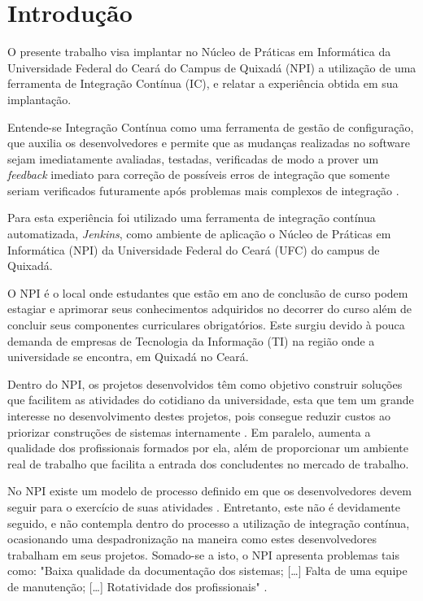 \chapter{Introdução}

O presente trabalho visa implantar no Núcleo de Práticas em Informática da Universidade Federal do Ceará do Campus de Quixadá (NPI) a utilização de uma ferramenta de Integração Contínua (IC), e relatar a experiência obtida em sua implantação.

Entende-se Integração Contínua como uma ferramenta de gestão de configuração, que auxilia os desenvolvedores e permite que as mudanças realizadas no software sejam imediatamente avaliadas, testadas, verificadas de modo a prover um  \textit{feedback} imediato para correção de possíveis erros de integração que somente seriam verificados futuramente após problemas mais complexos de integração \cite{paul2007}.

Para esta experiência foi utilizado uma ferramenta de integração contínua automatizada, \textit{Jenkins}, como ambiente de aplicação o Núcleo de Práticas em Informática (NPI) da Universidade Federal do Ceará (UFC) do campus de Quixadá.

O NPI é o local onde estudantes que estão em ano de conclusão de curso podem estagiar e aprimorar seus conhecimentos adquiridos no decorrer do curso além de concluir seus componentes curriculares obrigatórios. Este surgiu devido à pouca demanda de empresas de Tecnologia da Informação (TI) na região onde a universidade se encontra, em Quixadá no Ceará.

Dentro do NPI, os projetos desenvolvidos têm como objetivo construir soluções que facilitem as atividades do cotidiano da universidade, esta que tem um grande interesse no desenvolvimento destes projetos, pois consegue reduzir custos ao priorizar construções de sistemas internamente \cite{npi2013}. Em paralelo, aumenta a qualidade dos profissionais formados por ela, além de proporcionar um ambiente real de trabalho que facilita a entrada dos concludentes no mercado de trabalho.

No NPI existe um modelo de processo definido em que os desenvolvedores devem seguir para o exercício de suas atividades \cite{npi2013}. Entretanto, este não é devidamente seguido, e não contempla dentro do processo a utilização de integração contínua, ocasionando uma despadronização na maneira como estes  desenvolvedores trabalham em seus projetos. Somado-se a isto, o NPI apresenta problemas tais como: "Baixa qualidade da documentação dos sistemas; [\ldots] Falta de uma equipe de manutenção; [\ldots] Rotatividade dos profissionais" \cite[p.~4]{paduelli2006}.

